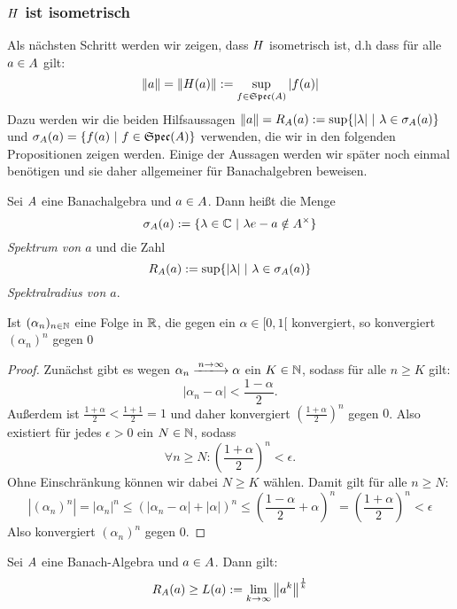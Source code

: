 \subsubsection{$H$ ist isometrisch}\label{sec:isometrisch}

Als nächsten Schritt werden wir zeigen, dass $H$ isometrisch ist, d.h dass für alle $a \in A$ gilt:
	\[\left\lVert a\right\rVert = \left\lVert H(a)\right\rVert := \underset{f \in \mathfrak{Spec}(A)}{\sup}\left|f(a)\right|\]
Dazu werden wir die beiden Hilfsaussagen $\left\lVert a\right\rVert = R_A(a) := \sup\{|\lambda| ~|~ \lambda \in \sigma_A(a)\}$ und $\sigma_A(a) = \{f(a) ~|~ f \in \mathfrak{Spec}(A)\}$ verwenden, die wir in den folgenden Propositionen zeigen werden. Einige der Aussagen werden wir später noch einmal benötigen und sie daher allgemeiner für Banachalgebren beweisen.

\begin{defn}[Spektrum] %
Sei $A$ eine Banachalgebra und $a \in A$. Dann heißt die Menge
	\[\sigma_A(a) := \{\lambda \in \mathbb{C} ~|~ \lambda e - a \notin A^\times\}\]
\emph{Spektrum von $a$} und die Zahl
	\[R_A(a) := \sup\{|\lambda| ~|~ \lambda \in \sigma_A(a)\}\]
\emph{Spektralradius von $a$}. 
\end{defn}


\begin{prop}\label{prop:Konvergenz}
Ist $(\alpha_n)_{n\in\mathbb{N}}$ eine Folge in $\mathbb{R}$, die gegen ein $\alpha \in [0,1[$ konvergiert, so konvergiert $(\alpha_n)^n$ gegen $0$
\end{prop}

\begin{proof}
Zunächst gibt es wegen $\alpha_n \xlongrightarrow{n\to\infty} \alpha$ ein $K \in \mathbb{N}$, sodass für alle $n\geq K$ gilt:
	\[|\alpha_n - \alpha| < \frac{1-\alpha}{2}.\]
Außerdem ist $\frac{1+\alpha}{2} < \frac{1+1}{2} = 1$ und daher konvergiert $\left(\frac{1+\alpha}{2}\right)^n$ gegen $0$. Also existiert für jedes $\epsilon > 0$ ein $N \in \mathbb{N}$, sodass
	\[\forall n \geq N: \left(\frac{1+\alpha}{2}\right)^n < \epsilon.\]
Ohne Einschränkung können wir dabei $N \geq K$ wählen. Damit gilt für alle $n \geq N$:
	\[\left|\left(\alpha_n\right)^n\right| = \left|\alpha_n\right|^n \leq \left(\left|\alpha_n - \alpha\right| + \left|\alpha\right|\right)^n \leq \left(\frac{1-\alpha}{2} + \alpha\right)^n = \left(\frac{1+\alpha}{2}\right)^n < \epsilon\]
Also konvergiert $(\alpha_n)^n$ gegen $0$.
\end{proof}


\begin{prop}\label{prop:R-groesser-lima}
Sei $A$ eine Banach-Algebra und $a \in A$. Dann gilt:
\[ R_A(a) \geq L(a) := \underset{k\to\infty}{\lim}\left\lVert a^k\right\rVert^\frac{1}{k}\]
\end{prop}

